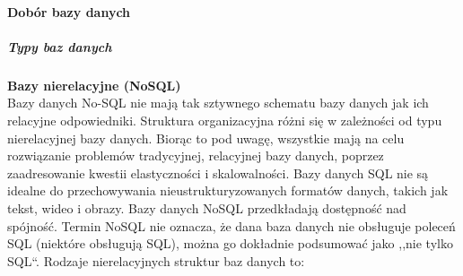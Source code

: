 \documentclass[12pt, a4paper, twoside, openany]{book}
\begin{document}
\paragraph{Dobór bazy danych}

\subparagraph{Typy baz danych\\}

\textbf{Bazy nierelacyjne (NoSQL)}\\
Bazy danych No-SQL nie mają tak sztywnego schematu bazy danych jak ich relacyjne odpowiedniki. Struktura organizacyjna różni się w zależności od typu nierelacyjnej bazy danych. Biorąc to pod uwagę, wszystkie mają na celu rozwiązanie problemów tradycyjnej, relacyjnej bazy danych, poprzez zaadresowanie kwestii elastyczności i skalowalności. Bazy danych SQL nie są idealne do przechowywania nieustrukturyzowanych formatów danych, takich jak tekst, wideo i obrazy. Bazy danych NoSQL przedkładają dostępność nad spójność.
Termin NoSQL nie oznacza, że dana baza danych nie obsługuje poleceń SQL (niektóre obsługują SQL), można go dokładnie podsumować jako ,,nie tylko SQL``.
Rodzaje nierelacyjnych struktur baz danych to:
\end{document}
